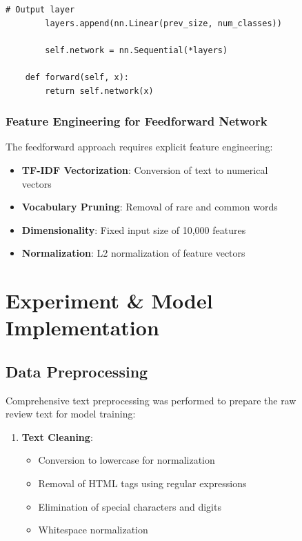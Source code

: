 \documentclass[a4paper, journal]{IEEEtran}
\begin{document}
\begin{figure}[!t]
\begin{lstlisting}[caption=Feedforward Neural Network Architecture]
        # Output layer
        layers.append(nn.Linear(prev_size, num_classes))
        
        self.network = nn.Sequential(*layers)
    
    def forward(self, x):
        return self.network(x)
\end{lstlisting}

\subsubsection{Feature Engineering for Feedforward Network}

The feedforward approach requires explicit feature engineering:

\begin{itemize}
    \item \textbf{TF-IDF Vectorization}: Conversion of text to numerical vectors
    \item \textbf{Vocabulary Pruning}: Removal of rare and common words
    \item \textbf{Dimensionality}: Fixed input size of 10,000 features
    \item \textbf{Normalization}: L2 normalization of feature vectors
\end{itemize}

\section{Experiment \& Model Implementation}

\subsection{Data Preprocessing}

Comprehensive text preprocessing was performed to prepare the raw review text for model training:

\begin{enumerate}
    \item \textbf{Text Cleaning}: 
    \begin{itemize}
        \item Conversion to lowercase for normalization
        \item Removal of HTML tags using regular expressions
        \item Elimination of special characters and digits
        \item Whitespace normalization
    \end{itemize}
    

\end{enumerate}
\end{figure}
\end{document}
